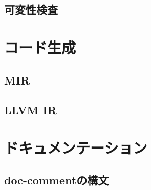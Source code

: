 \documentclass[dvipdfmx,uplatex,papersize,a4paper,10pt]{jsbook}
\theoremstyle{definition}
\begin{document}
\section{可変性検査}



\chapter{コード生成}

\section{MIR}

\section{LLVM IR}



\chapter{ドキュメンテーション}

\section{doc-commentの構文}





\end{document}
